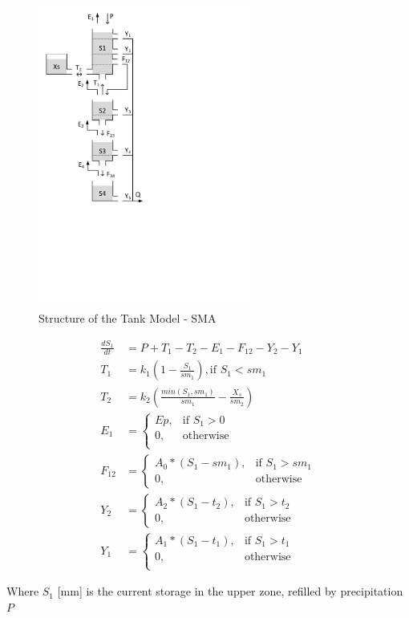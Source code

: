 { 																	%
\begin{figure}
\includegraphics[trim=1cm 10cm 7cm 1cm,width=7cm,keepaspectratio]{./files/38_schematic.pdf}
\caption{Structure of the Tank Model - SMA} \label{fig:38_schematic}
\end{figure}

\begin{align}
	\frac{dS_1}{dt} &= P+T_1-T_2-E_1-F_{12}-Y_2-Y_1 \\
	T_1 &= k_1\left(1-\frac{S_1}{sm_1}\right), \text{if } S_1 < sm_1\\
	T_2 &= k_2\left(\frac{min(S_1,sm_1)}{sm_1}-\frac{X_s}{sm_2}\right) \\
	E_1 &= \begin{cases}
		Ep, &\text{if } S_1 > 0 \\
		0, & \text{otherwise} \\
	\end{cases} \\
	F_{12} &= \begin{cases}
		A_0*(S_1-sm_1), & \text{if } S_1 > sm_1 \\
		0, & \text{otherwise}
	\end{cases}\\
	Y_2 &= 
	\begin{cases}
		A_2*(S_1-t_2), & \text{if } S_1 > t_2 \\
		0, & \text{otherwise}
	\end{cases}\\
	Y_1 &= 
	\begin{cases}
		A_1*(S_1-t_1), & \text{if } S_1 > t_1 \\
		0, & \text{otherwise}\\
	\end{cases}
\end{align}

Where $S_1$ [mm] is the current storage in the upper zone, refilled by precipitation $P$ 

} %

